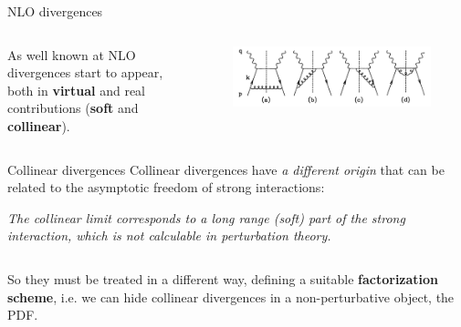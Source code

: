 \documentclass[8pt]{beamer}
\begin{document}
\begin{frame}{NLO divergences}
    \begin{columns}
        \begin{column}{0.4\textwidth}
            As well known at NLO divergences start to appear, both in \textbf{virtual}
            and real contributions (\textbf{soft} and \textbf{collinear}).
        \end{column}

        \begin{column}{0.55\textwidth}
            \begin{figure}
                \centering
                \includegraphics[width=\textwidth]{pictures/nlo-real}
            \end{figure}
        \end{column}
    \end{columns}

    \vspace*{10pt}

    \begin{block}{Collinear divergences}
    \vspace*{1pt}
    Collinear divergences have \textit{a different origin} that can be
    related to the asymptotic freedom of strong interactions:
    \end{block}

    \begin{center}
        \textit{The collinear limit corresponds to a long range (soft)
        part of the strong interaction, which is not calculable in
        perturbation theory.}
    \end{center}

    \begin{columns}
        \begin{column}{0.4\textwidth}
            So they must be treated in a different way, defining a suitable
            \textbf{factorization scheme},\newline
            i.e. we can hide collinear divergences in a non-perturbative
            object, the PDF.


\end{column}
\end{columns}
\end{frame}
\end{document}
